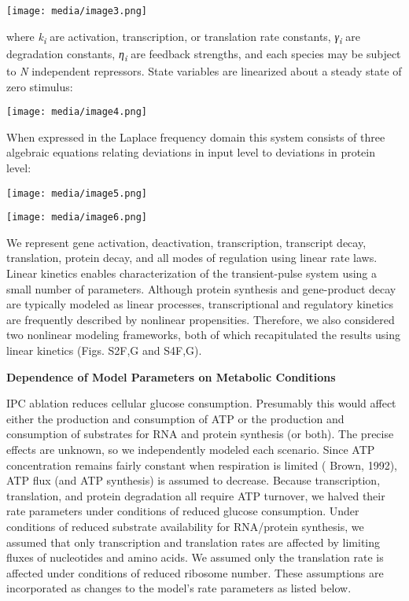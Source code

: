\texttt{[image: media/image3.png]}

where \emph{k\textsubscript{i}} are activation, transcription, or translation rate constants, \emph{γ\textsubscript{i}} are degradation constants, \emph{η\textsubscript{i}} are feedback strengths, and each species may be subject to \emph{N} independent repressors. State variables are linearized about a steady state of zero stimulus:

\texttt{[image: media/image4.png]}

When expressed in the Laplace frequency domain this system consists of three algebraic equations relating deviations in input level to deviations in protein level:

\texttt{[image: media/image5.png]}

\texttt{[image: media/image6.png]}

We represent gene activation, deactivation, transcription, transcript decay, translation, protein decay, and all modes of regulation using linear rate laws. Linear kinetics enables characterization of the transient-pulse system using a small number of parameters. Although protein synthesis and gene-product decay are typically modeled as linear processes, transcriptional and regulatory kinetics are frequently described by nonlinear propensities. Therefore, we also considered two nonlinear modeling frameworks, both of which recapitulated the results using linear kinetics (Figs. S2F,G and S4F,G).

\textbf{Dependence of Model Parameters on Metabolic Conditions}

IPC ablation reduces cellular glucose consumption. Presumably this would affect either the production and consumption of ATP or the production and consumption of substrates for RNA and protein synthesis (or both). The precise effects are unknown, so we independently modeled each scenario. Since ATP concentration remains fairly constant when respiration is limited ( Brown, 1992), ATP flux (and ATP synthesis) is assumed to decrease. Because transcription, translation, and protein degradation all require ATP turnover, we halved their rate parameters under conditions of reduced glucose consumption. Under conditions of reduced substrate availability for RNA/protein synthesis, we assumed that only transcription and translation rates are affected by limiting fluxes of nucleotides and amino acids. We assumed only the translation rate is affected under conditions of reduced ribosome number. These assumptions are incorporated as changes to the model's rate parameters as listed below.

